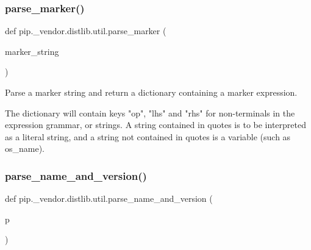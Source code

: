 \mbox{\label{namespacepip_1_1__vendor_1_1distlib_1_1util_a2d33a11e61e348ae3021d0bc76379089}} 
\subsubsection{\texorpdfstring{parse\+\_\+marker()}{parse\_marker()}}
{\footnotesize\ttfamily def pip.\+\_\+vendor.\+distlib.\+util.\+parse\+\_\+marker (\begin{DoxyParamCaption}\item[{}]{marker\+\_\+string }\end{DoxyParamCaption})}

\begin{DoxyVerb}Parse a marker string and return a dictionary containing a marker expression.

The dictionary will contain keys "op", "lhs" and "rhs" for non-terminals in
the expression grammar, or strings. A string contained in quotes is to be
interpreted as a literal string, and a string not contained in quotes is a
variable (such as os_name).
\end{DoxyVerb}
 \mbox{\label{namespacepip_1_1__vendor_1_1distlib_1_1util_a790092804a63d6bd8b2c17117864b1b6}} 
\subsubsection{\texorpdfstring{parse\+\_\+name\+\_\+and\+\_\+version()}{parse\_name\_and\_version()}}
{\footnotesize\ttfamily def pip.\+\_\+vendor.\+distlib.\+util.\+parse\+\_\+name\+\_\+and\+\_\+version (\begin{DoxyParamCaption}\item[{}]{p }\end{DoxyParamCaption})}

